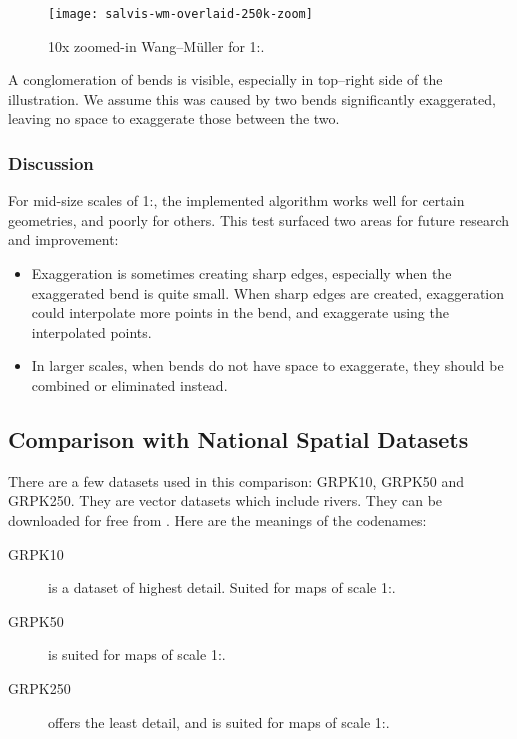 \documentclass[a4paper]{article}
\newcommand{\WM}{Wang--M{\"u}ller}
\begin{document}
\begin{figure}[ht]
    \centering
    \texttt{[image: salvis-wm-overlaid-250k-zoom]}
    \caption{10x zoomed-in {\WM} for 1:.}
    \label{fig:salvis-wm220-overlaid-zoom}
\end{figure}

A conglomeration of bends is visible, especially in top--right side of the
illustration. We assume this was caused by two bends significantly exaggerated,
leaving no space to exaggerate those between the two.

\subsubsection{Discussion}

For mid-size scales of 1:, the implemented algorithm works well
for certain geometries, and poorly for others. This test surfaced two areas for
future research and improvement:

\begin{itemize}

    \item Exaggeration is sometimes creating sharp edges, especially when the
        exaggerated bend is quite small. When sharp edges are created,
        exaggeration could interpolate more points in the bend, and exaggerate
        using the interpolated points.

    \item In larger scales, when bends do not have space to exaggerate, they
        should be combined or eliminated instead.

\end{itemize}

\subsection{Comparison with National Spatial Datasets}

There are a few datasets used in this comparison: GRPK10, GRPK50 and
GRPK250. They are vector datasets which include rivers. They can be
downloaded for free from \cite{nzt}. Here are the meanings of the codenames:

\begin{description}

    \item[GRPK10] is a dataset of highest detail. Suited for maps of scale
        1:.

    \item[GRPK50] is suited for maps of scale 1:.

    \item[GRPK250] offers the least detail, and is suited for maps of
        scale 1:.

\end{description}
\end{document}
